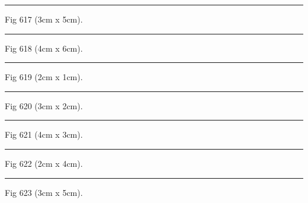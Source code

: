 \documentclass[a4paper,11pt]{article}
\begin{document}
\begin{swarmwrap}%
  \begin{minipage}[t]{3cm}
    \centering
    \rule{\linewidth}{5cm}
    {\footnotesize Fig 617 (3cm x 5cm).}
  \end{minipage}%
\end{swarmwrap}%
\swarmwrapnext
\lipsum[17]%

\begin{swarmwrap}%
  \begin{minipage}[t]{4cm}
    \centering
    \rule{\linewidth}{6cm}
    {\footnotesize Fig 618 (4cm x 6cm).}
  \end{minipage}%
\end{swarmwrap}%
\swarmwrapnext
\lipsum[18]%

\begin{swarmwrap}%
  \begin{minipage}[t]{2cm}
    \centering
    \rule{\linewidth}{1cm}
    {\footnotesize Fig 619 (2cm x 1cm).}
  \end{minipage}%
\end{swarmwrap}%
\swarmwrapnext
\lipsum[19]%

\begin{swarmwrap}%
  \begin{minipage}[t]{3cm}
    \centering
    \rule{\linewidth}{2cm}
    {\footnotesize Fig 620 (3cm x 2cm).}
  \end{minipage}%
\end{swarmwrap}%
\swarmwrapnext
\lipsum[20]%

\begin{swarmwrap}%
  \begin{minipage}[t]{4cm}
    \centering
    \rule{\linewidth}{3cm}
    {\footnotesize Fig 621 (4cm x 3cm).}
  \end{minipage}%
\end{swarmwrap}%
\swarmwrapnext
\lipsum[21]%

\begin{swarmwrap}%
  \begin{minipage}[t]{2cm}
    \centering
    \rule{\linewidth}{4cm}
    {\footnotesize Fig 622 (2cm x 4cm).}
  \end{minipage}%
\end{swarmwrap}%
\swarmwrapnext
\lipsum[22]%

\begin{swarmwrap}%
  \begin{minipage}[t]{3cm}
    \centering
    \rule{\linewidth}{5cm}
    {\footnotesize Fig 623 (3cm x 5cm).}
  \end{minipage}%
\end{swarmwrap}%
\swarmwrapnext
\lipsum[23]%
\end{document}
